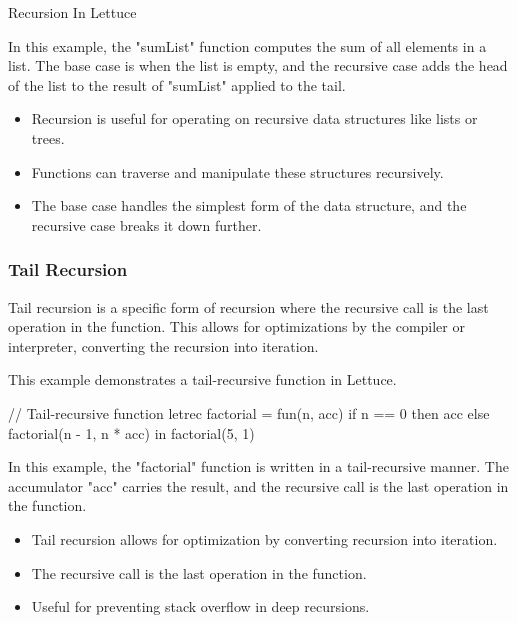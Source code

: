 \begin{notes}{Recursion In Lettuce}
\begin{highlight}
        In this example, the "sumList" function computes the sum of all elements in a list. The base case is when the list is empty, and the recursive case adds the head of the list to the result of "sumList" applied to the tail.
    
        \begin{itemize}
            \item Recursion is useful for operating on recursive data structures like lists or trees.
            \item Functions can traverse and manipulate these structures recursively.
            \item The base case handles the simplest form of the data structure, and the recursive case breaks it down further.
        \end{itemize}
    
    \end{highlight}
    
    \subsubsection*{Tail Recursion}
    
    Tail recursion is a specific form of recursion where the recursive call is the last operation in the function. This allows for optimizations by the compiler or interpreter, converting the recursion into iteration.
    
    \begin{highlight}
    
        This example demonstrates a tail-recursive function in Lettuce.
    
    \begin{code}[Lettuce]
    // Tail-recursive function
    letrec factorial = fun(n, acc) {
        if n == 0 then acc else factorial(n - 1, n * acc)
    } in
    factorial(5, 1)
    \end{code}
    
        In this example, the "factorial" function is written in a tail-recursive manner. The accumulator "acc" carries the result, and the recursive call is the last operation in the function.
    
        \begin{itemize}
            \item Tail recursion allows for optimization by converting recursion into iteration.
            \item The recursive call is the last operation in the function.
            \item Useful for preventing stack overflow in deep recursions.
        \end{itemize}
    

\end{highlight}
\end{notes}

